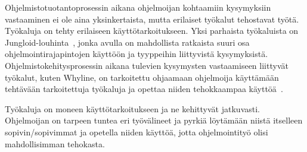 \documentclass[finnish]{tktltiki2}
\theoremstyle{definition}
\theoremstyle{remark}
\begin{document}
Ohjelmistotuotantoprosessin aikana ohjelmoijan kohtaamiin kysymyksiin vastaaminen ei ole aina yksinkertaista, mutta erilaiset työkalut tehostavat työtä. Työkaluja on tehty erilaiseen käyttötarkoitukseen. Yksi parhaista työkaluista on Jungloid-louhinta~\cite{jungloid-mining}, jonka avulla on mahdollista ratkaista suuri osa ohjelmointirajapintojen käyttöön ja tyyppeihin liittyvistä kysymyksistä. Ohjelmistokehitysprosessin aikana tulevien kysymysten vastaamiseen liittyvät työkalut, kuten Whyline, on tarkoitettu ohjaamaan ohjelmoija käyttämään tehtävään tarkoitettuja työkaluja ja opettaa niiden tehokkaampaa käyttöä~\cite{whyline}.

Työkaluja on moneen käyttötarkoitukseen ja ne kehittyvät jatkuvasti. Ohjelmoijan on tarpeen tuntea eri työvälineet ja pyrkiä löytämään niistä itselleen sopivin/sopivimmat ja opetella niiden käyttöä, jotta ohjelmointityö olisi mahdollisimman tehokasta.

\newpage


\end{document}
